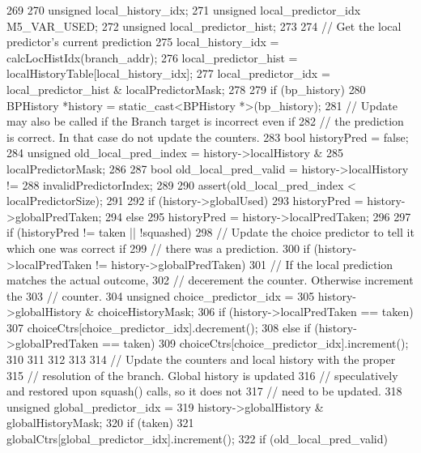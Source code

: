 \begin{DoxyCode}
269 {
270     unsigned local_history_idx;
271     unsigned local_predictor_idx M5_VAR_USED;
272     unsigned local_predictor_hist;
273 
274     // Get the local predictor's current prediction
275     local_history_idx = calcLocHistIdx(branch_addr);
276     local_predictor_hist = localHistoryTable[local_history_idx];
277     local_predictor_idx = local_predictor_hist & localPredictorMask;
278 
279     if (bp_history) {
280         BPHistory *history = static_cast<BPHistory *>(bp_history);
281         // Update may also be called if the Branch target is incorrect even if
282         // the prediction is correct. In that case do not update the counters.
283         bool historyPred = false;
284         unsigned old_local_pred_index = history->localHistory &
285                 localPredictorMask;
286 
287         bool old_local_pred_valid = history->localHistory !=
288             invalidPredictorIndex;
289 
290         assert(old_local_pred_index < localPredictorSize);
291 
292         if (history->globalUsed) {
293            historyPred = history->globalPredTaken;
294         } else {
295            historyPred = history->localPredTaken;
296         }
297         if (historyPred != taken || !squashed) {
298             // Update the choice predictor to tell it which one was correct if
299             // there was a prediction.
300             if (history->localPredTaken != history->globalPredTaken) {
301                  // If the local prediction matches the actual outcome,
302                  // decerement the counter.  Otherwise increment the
303                  // counter.
304                  unsigned choice_predictor_idx =
305                    history->globalHistory & choiceHistoryMask;
306                  if (history->localPredTaken == taken) {
307                      choiceCtrs[choice_predictor_idx].decrement();
308                  } else if (history->globalPredTaken == taken) {
309                      choiceCtrs[choice_predictor_idx].increment();
310                  }
311 
312              }
313 
314              // Update the counters and local history with the proper
315              // resolution of the branch.  Global history is updated
316              // speculatively and restored upon squash() calls, so it does not
317              // need to be updated.
318              unsigned global_predictor_idx =
319                history->globalHistory & globalHistoryMask;
320              if (taken) {
321                   globalCtrs[global_predictor_idx].increment();
322                   if (old_local_pred_valid) {
}}}}}
\end{DoxyCode}
